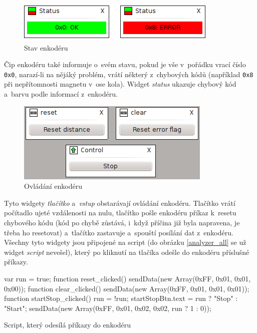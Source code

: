 \documentclass[12pt, a4paper, oneside]{article}
\newcommand{\It}{\textit}  %
\begin{document}
\begin{figure}[H]
\begin{center}
\includegraphics[width=\textwidth]{img/enc_status.png}
\caption{Stav enkodéru}
\end{center}
\end{figure}
Čip enkodéru také informuje o~svém stavu, pokud je vše v~pořádku vrací číslo \verb|0x0|, narazí-li na nějáký problém, vrátí některý z~chybových kódů (například \verb|0x8| při nepřítomnosti magnetu v~ose kola). Widget \It{status} ukazuje chybový kód a~barvu podle informací z~enkodéru.

\begin{figure}[H]
\begin{center}
\includegraphics[width=\textwidth-50pt]{img/enc_ctrl.png}
\caption{Ovládání enkodéru}
\end{center}
\end{figure}
Tyto widgety \It{tlačítko} a~\It{vstup} obstarávají ovládání enkodéru. Tlačítko  vrátí počítadlo ujeté vzdálenosti na nulu, tlačítko  pošle enkodéru příkaz k~resetu chybového kódu (kód po chybě zůstává, i~když příčina již byla napravena, je třeba ho resetovat) a~tlačítko  zastavuje a~spouští posílání dat z~enkodéru. Všechny tyto widgety jsou připojené na script (do obrázku \ref{analyzer_all} se už widget \It{script} nevešel), který po kliknutí na tlačíka odešle do enkodéru příslušné příkazy.
\begin{listing}[H]
\begin{jscode}
var run = true;
function reset_clicked() {
    sendData(new Array(0xFF, 0x01, 0x01, 0x00));
}
function clear_clicked() {
    sendData(new Array(0xFF, 0x01, 0x01, 0x01));
}
function startStop_clicked() {
    run = !run;
    startStopBtn.text = run ? "Stop" : "Start";
    sendData(new Array(0xFF, 0x01, 0x02, 0x02, run ? 1 : 0));
}
\end{jscode}
\caption{Script, který odesílá příkazy do enkodéru}
\end{listing}
\end{document}
